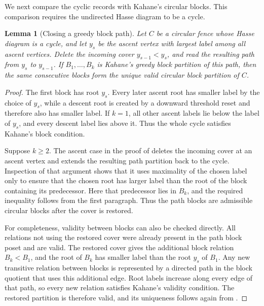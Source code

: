 \documentclass[10pt,a4paper]{amsart}
\newtheorem{lemma}[theorem]{Lemma}
\begin{document}
We next compare the cyclic records with Kahane's circular blocks.  This
comparison requires the undirected Hasse diagram to be a cycle.

\begin{lemma}[Closing a greedy block path]
\label{lem:closing-greedy-blocks}
Let \(C\) be a circular fence whose Hasse diagram is a cycle, and let \(y_s\)
be the ascent vertex with largest label among all ascent vertices.  Delete
the incoming cover \(y_{s-1}<y_s\), and read the resulting path from \(y_s\)
to \(y_{s-1}\).  If \(B_1,\ldots,B_k\) is Kahane's greedy block partition of
this path, then the same consecutive blocks form the unique valid circular
block partition of \(C\).
\end{lemma}

\begin{proof}
The first block has root \(y_s\).  Every later ascent root has smaller label
by the choice of \(y_s\), while a descent root is created by a downward
threshold reset and therefore also has smaller label.  If \(k=1\), all other
ascent labels lie below the label of \(y_s\), and every descent label lies
above it.  Thus the whole cycle satisfies Kahane's block condition.

Suppose \(k\ge2\).  The ascent case in the proof of
\cite[Lemma~4.7]{Kahane} deletes the incoming cover at an ascent vertex and
extends the resulting path partition back to the cycle.  Inspection of that
argument shows that it uses maximality of the chosen label only to ensure that
the chosen root has larger label than the root of the block containing its
predecessor.  Here that predecessor lies in \(B_k\), and the required
inequality follows from the first paragraph.  Thus the path blocks are
admissible circular blocks after the cover is restored.

For completeness, validity between blocks can also be checked directly.  All
relations not using the restored cover were already present in the path block
poset and are valid.  The restored cover gives the additional block relation
\(B_k<B_1\), and the root of \(B_k\) has smaller label than the root \(y_s\) of
\(B_1\).  Any new transitive relation between blocks is represented by a
directed path in the block quotient that uses this additional edge.  Root
labels increase along every edge of that path, so every new relation satisfies
Kahane's validity condition.  The restored partition is therefore valid, and
its uniqueness follows again from \cite[Lemma~4.7]{Kahane}.
\end{proof}
\end{document}
